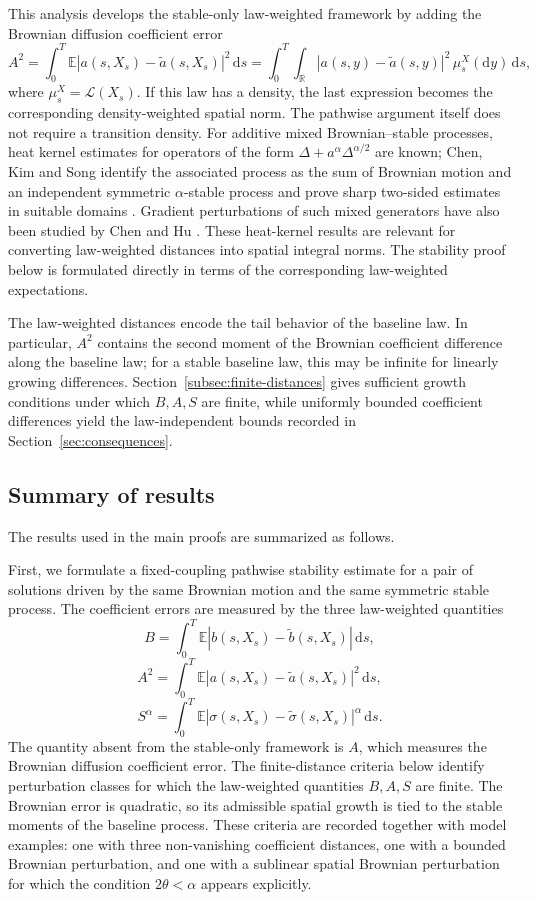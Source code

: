 \documentclass[11pt]{article}
\newcommand{\1}{\mathbf{1}}
\newcommand{\dd}{\,\mathrm{d}}
\newcommand{\md}{\mathrm{d}}
\newcommand{\wt}{\tilde}
\begin{document}
This analysis develops the stable-only law-weighted framework by adding the Brownian diffusion coefficient error
\[
  A^2=\int_0^T\mathbb E |a(s,X_s)-\wt a(s,X_s)|^2\dd s
    =\int_0^T\int_{\mathbb R}|a(s,y)-\wt a(s,y)|^2\,\mu_s^X(\md y)\dd s,
\]
where $\mu_s^X=\mathcal L(X_s)$. If this law has a density, the last expression becomes the corresponding density-weighted spatial norm. The pathwise argument itself does not require a transition density. For additive mixed Brownian--stable processes, heat kernel estimates for operators of the form $\Delta+a^\alpha\Delta^{\alpha/2}$ are known; Chen, Kim and Song identify the associated process as the sum of Brownian motion and an independent symmetric $\alpha$-stable process and prove sharp two-sided estimates in suitable domains \cite{ChenKimSong2010}. Gradient perturbations of such mixed generators have also been studied by Chen and Hu \cite{ChenHu2015}. These heat-kernel results are relevant for converting law-weighted distances into spatial integral norms. The stability proof below is formulated directly in terms of the corresponding law-weighted expectations.

The law-weighted distances encode the tail behavior of the baseline law. In particular, $A^2$ contains the second moment of the Brownian coefficient difference along the baseline law; for a stable baseline law, this may be infinite for linearly growing differences. Section~\ref{subsec:finite-distances} gives sufficient growth conditions under which $B,A,S$ are finite, while uniformly bounded coefficient differences yield the law-independent bounds recorded in Section~\ref{sec:consequences}.


\subsection{Summary of results}
\label{subsec:contributions}

The results used in the main proofs are summarized as follows.

First, we formulate a fixed-coupling pathwise stability estimate for a pair of solutions driven by the same Brownian motion and the same symmetric stable process. The coefficient errors are measured by the three law-weighted quantities
\[
  B=\int_0^T\mathbb E |b(s,X_s)-\wt b(s,X_s)|\dd s,
\]
\[
  A^2=\int_0^T\mathbb E |a(s,X_s)-\wt a(s,X_s)|^2\dd s,
\]
\[
  S^\alpha=\int_0^T\mathbb E |\sigma(s,X_s)-\wt\sigma(s,X_s)|^\alpha\dd s.
\]
The quantity absent from the stable-only framework is $A$, which measures the Brownian diffusion coefficient error. The finite-distance criteria below identify perturbation classes for which the law-weighted quantities $B,A,S$ are finite. The Brownian error is quadratic, so its admissible spatial growth is tied to the stable moments of the baseline process. These criteria are recorded together with model examples: one with three non-vanishing coefficient distances, one with a bounded Brownian perturbation, and one with a sublinear spatial Brownian perturbation for which the condition $2\theta<\alpha$ appears explicitly.
\end{document}
